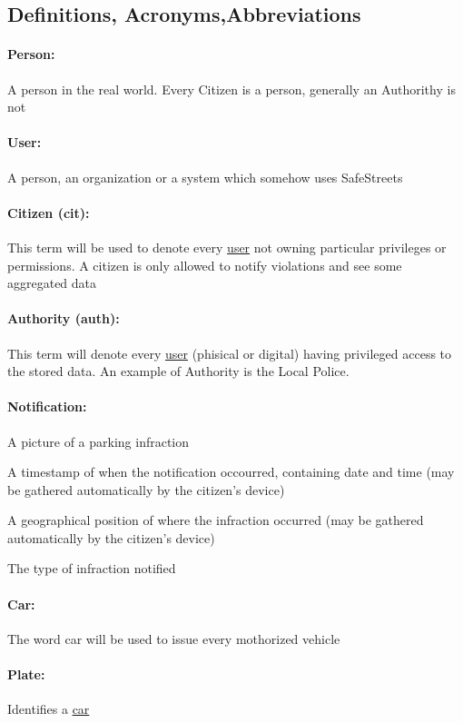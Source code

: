 \documentclass{article}
\begin{document}
	\subsection{Definitions, Acronyms,Abbreviations}
		\paragraph{Person:}A person in the real world. Every Citizen is a person, generally an Authorithy is not
		\paragraph{User:}A person, an organization or a system which somehow uses SafeStreets
		\paragraph{Citizen (cit):} This term will be used to denote every \underline{user} not owning particular privileges or permissions. A citizen is only allowed to notify violations and see some aggregated data
		\paragraph{Authority (auth):} This term will denote every \underline{user} (phisical or digital) having privileged access to the stored data. An example of Authority is the Local Police.
		\paragraph{Notification:} 
			\begin{list}{-}{Represents a set of data submitted by any user composed by:}
				\item A picture of a parking infraction
				\item A timestamp of when the notification occourred, containing date and time (may be gathered automatically by the citizen's device)
				\item A geographical position of where the infraction occurred (may be gathered automatically by the citizen's device)
				\item The type of infraction notified
			\end{list}
		\paragraph{Car:}The word car will be used to issue every mothorized vehicle
		\paragraph{Plate:}Identifies a \underline{car}
\end{document}
